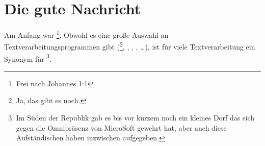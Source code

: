 \chapter{Die gute Nachricht}

\noindent Am Anfang war \footnote{Frei nach Johannes 1:1}.
Obwohl es eine große Auswahl an Textverarbeitungsprogrammen gibt
(\footnote{Ja, das gibt es noch.}, , , , \dots),
ist für viele Textverarbeitung ein Synonym für %
\footnote{Im Süden der Republik gab es bis vor kurzem noch ein kleines Dorf 
das sich gegen die Omnipräsenz von MicroSoft gewehrt hat,
aber auch diese Aufständischen haben inzwischen aufgegeben.}.

